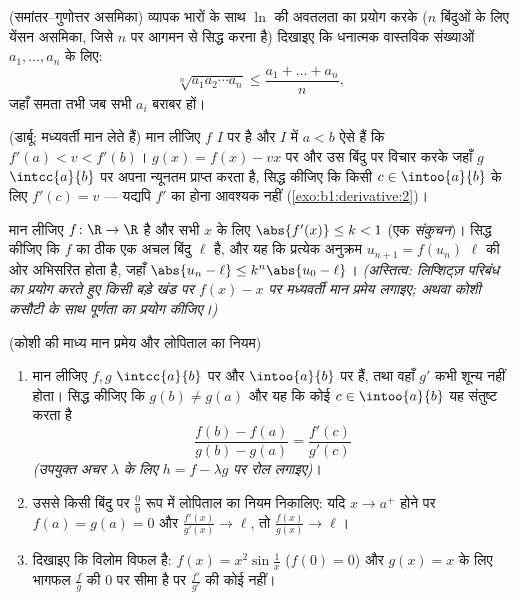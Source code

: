 \begin{exercise}[$\star\star$]\label{exo:b1:derivative:9}
(समांतर--गुणोत्तर असमिका) व्यापक भारों के साथ $\ln$ की अवतलता का प्रयोग करके
($n$ बिंदुओं के लिए येंसन असमिका, जिसे $n$ पर आगमन से सिद्ध करना है) दिखाइए
कि धनात्मक वास्तविक संख्याओं $a_1, \dots, a_n$ के लिए:
\[
\sqrt[n]{a_1 a_2 \cdots a_n} \leq \frac{a_1 + \dots + a_n}{n},
\]
जहाँ समता तभी जब सभी $a_i$ बराबर हों।
\end{exercise}

\begin{exercise}[$\star\star\star$]\label{exo:b1:derivative:10}
(डार्बू:  मध्यवर्ती मान लेते हैं) मान लीजिए $f$ $I$ पर  है और
$I$ में $a < b$ ऐसे हैं कि $f'(a) < v < f'(b)$। $g(x) = f(x) - vx$ पर और उस
बिंदु पर विचार करके जहाँ $g$ $\intcc{a}{b}$ पर अपना न्यूनतम प्राप्त करता है,
सिद्ध कीजिए कि किसी $c \in \intoo{a}{b}$ के लिए $f'(c) = v$ --- यद्यपि $f'$
का  होना आवश्यक नहीं (\cref{exo:b1:derivative:2})।
\end{exercise}

\begin{exercise}[$\star\star\star$]\label{exo:b1:derivative:11}
मान लीजिए $f \colon \R \to \R$  है और सभी $x$ के लिए $\abs{f'(x)}
\leq k < 1$ (एक \emph{संकुचन})। सिद्ध कीजिए कि $f$ का ठीक एक अचल बिंदु
$\ell$ है, और यह कि प्रत्येक अनुक्रम $u_{n+1} = f(u_n)$ $\ell$ की ओर अभिसरित
होता है, जहाँ $\abs{u_n - \ell} \leq k^n\abs{u_0 - \ell}$। \emph{(अस्तित्व:
लिप्शिट्ज़ परिबंध का प्रयोग करते हुए किसी बड़े खंड पर $f(x) - x$ पर
मध्यवर्ती मान प्रमेय लगाइए; अथवा कोशी कसौटी के साथ पूर्णता का प्रयोग
कीजिए।)}
\end{exercise}

\begin{exercise}[$\star\star\star$]\label{exo:b1:derivative:12}
(कोशी की माध्य मान प्रमेय और लोपिताल का नियम)
\begin{enumerate}
  \item मान लीजिए $f, g$ $\intcc{a}{b}$ पर  और $\intoo{a}{b}$ पर 
  हैं, तथा वहाँ $g'$ कभी शून्य नहीं होता। सिद्ध कीजिए कि $g(b) \neq g(a)$ और
  यह कि कोई $c \in \intoo{a}{b}$ यह संतुष्ट करता है
        \[
        \frac{f(b) - f(a)}{g(b) - g(a)} = \frac{f'(c)}{g'(c)}
        \]
        \emph{(उपयुक्त अचर $\lambda$ के लिए $h = f - \lambda g$ पर रोल
        लगाइए)}।
  \item उससे किसी बिंदु पर $\frac00$ रूप में लोपिताल का नियम निकालिए: यदि $x
  \to a^+$ होने पर $f(a) = g(a) = 0$ और $\frac{f'(x)}{g'(x)} \to \ell$, तो
  $\frac{f(x)}{g(x)} \to \ell$।
  \item दिखाइए कि विलोम विफल है: $f(x) = x^2\sin\frac1x$ ($f(0) = 0$) और
  $g(x) = x$ के लिए भागफल $\frac{f}{g}$ की $0$ पर सीमा है पर $\frac{f'}{g'}$
  की कोई नहीं।
\end{enumerate}
\end{exercise}

